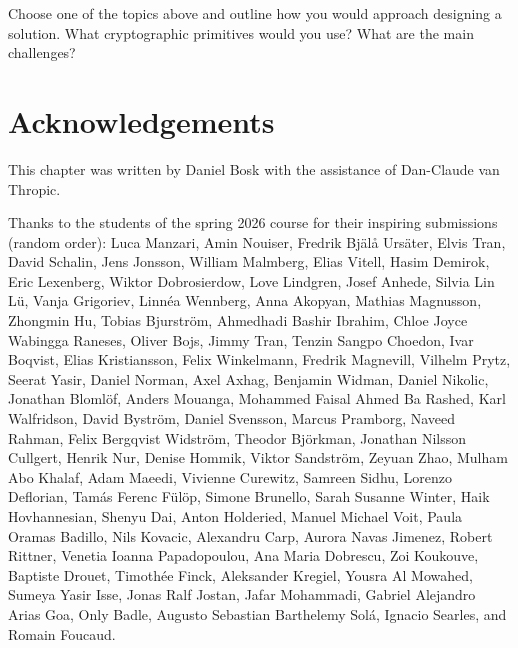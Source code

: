 \begin{exercise}
  Choose one of the topics above and outline how you would approach
  designing a solution.
  What cryptographic primitives would you use?
  What are the main challenges?
\end{exercise}


\section*{Acknowledgements}

This chapter was written by Daniel Bosk with the assistance of Dan-Claude
van Thropic.

Thanks to the students of the spring 2026 course for their inspiring 
submissions (random order):
Luca Manzari, Amin Nouiser, Fredrik Bjälå Ursäter, Elvis Tran, David Schalin, 
Jens Jonsson, William Malmberg, Elias Vitell, Hasim Demirok, Eric Lexenberg, 
Wiktor Dobrosierdow, Love Lindgren, Josef Anhede, Silvia Lin Lü, Vanja 
Grigoriev, Linnéa Wennberg, Anna Akopyan, Mathias Magnusson, Zhongmin Hu, 
Tobias Bjurström, Ahmedhadi Bashir Ibrahim, Chloe Joyce Wabingga Raneses, 
Oliver Bojs, Jimmy Tran, Tenzin Sangpo Choedon, Ivar Boqvist, Elias 
Kristiansson, Felix Winkelmann, Fredrik Magnevill, Vilhelm Prytz, Seerat Yasir, 
Daniel Norman, Axel Axhag, Benjamin Widman, Daniel Nikolic, Jonathan Blomlöf, 
Anders Mouanga, Mohammed Faisal Ahmed Ba Rashed, Karl Walfridson, David 
Byström, Daniel Svensson, Marcus Pramborg, Naveed Rahman, Felix Bergqvist 
Widström, Theodor Björkman, Jonathan Nilsson Cullgert, Henrik Nur, Denise 
Hommik, Viktor Sandström, Zeyuan Zhao, Mulham Abo Khalaf, Adam Maeedi, Vivienne 
Curewitz, Samreen Sidhu, Lorenzo Deflorian, Tamás Ferenc Fülöp, Simone 
Brunello, Sarah Susanne Winter, Haik Hovhannesian, Shenyu Dai, Anton Holderied, 
Manuel Michael Voit, Paula Oramas Badillo, Nils Kovacic, Alexandru Carp, Aurora 
Navas Jimenez, Robert Rittner, Venetia Ioanna Papadopoulou, Ana Maria Dobrescu, 
Zoi Koukouve, Baptiste Drouet, Timothée Finck, Aleksander Kregiel, Yousra Al 
Mowahed, Sumeya Yasir Isse, Jonas Ralf Jostan, Jafar Mohammadi, Gabriel 
Alejandro Arias Goa, Only Badle, Augusto Sebastian Barthelemy Solá, Ignacio 
Searles, and Romain Foucaud.
